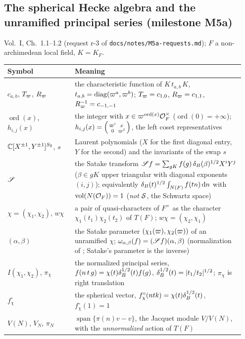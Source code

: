 \subsection*{The spherical Hecke algebra and the unramified principal series (milestone M5a)}\label{notation:m5a}
Vol.~I, Ch.~1.1--1.2 (request r-3 of \texttt{docs/notes/M5a-requests.md}); $F$ a non-archimedean local field, $K=K_F$.
\begin{longtable}{@{}p{0.27\linewidth}p{0.68\linewidth}@{}}
\toprule
Symbol & Meaning \\ \midrule
\endhead
$c_{a,b}$, $T_\varpi$, $R_\varpi$ & the characteristic function of $K\,t_{a,b}\,K$, $t_{a,b}=\operatorname{diag}(\varpi^a,\varpi^b)$; $T_\varpi=c_{1,0}$, $R_\varpi=c_{1,1}$,
  $R_\varpi^{-1}=c_{-1,-1}$ \\
$\operatorname{ord}(x)$, $h_{i,j}(x)$ & the integer with $x\in\varpi^{\operatorname{ord}(x)}\mathcal{O}_F^\times$ ($\operatorname{ord}(0)=+\infty$);
  $h_{i,j}(x)=\begin{psmallmatrix}\varpi^i&x\\0&\varpi^j\end{psmallmatrix}$, the left coset representatives \\
$\mathbb{C}[X^{\pm1},Y^{\pm1}]^{S_2}$, $s$ & Laurent polynomials ($X$ for the first diagonal entry, $Y$ for the second) and the invariants of the swap $s$ \\
$\mathscr{S}$ & the Satake transform $\mathscr{S} f=\sum_{gK}f(g)\,\delta_B(\beta)^{1/2}X^iY^j$ ($\beta\in gK$ upper triangular with diagonal exponents $(i,j)$);
  equivalently $\delta_B(t)^{1/2}\int_{N(F)}f(tn)\,\mathrm{d} n$ with $\operatorname{vol}(N(\mathcal{O}_F))=1$ (\emph{not} $\mathcal{S}$, the Schwartz space) \\
$\chi=(\chi_1,\chi_2)$, $w\chi$ & a pair of quasi-characters of $F^\times$ as the character $\chi_1(t_1)\chi_2(t_2)$ of $T(F)$; $w\chi=(\chi_2,\chi_1)$ \\
$(\alpha,\beta)$ & the Satake parameter $(\chi_1(\varpi),\chi_2(\varpi))$ of an unramified $\chi$; $\omega_{\alpha,\beta}(f)=(\mathscr{S} f)(\alpha,\beta)$
  (normalization of \cite[Prop.~40]{BumpH}; Satake's parameter is the inverse) \\
$I(\chi_1,\chi_2)$, $\pi_\chi$ & the normalized principal series, $f(n\,t\,g)=\chi(t)\delta_B^{1/2}(t)f(g)$, $\delta_B^{1/2}(t)=\lvert t_1/t_2\rvert^{1/2}$;
  $\pi_\chi$ is right translation \\
$f^\circ_\chi$ & the spherical vector, $f^\circ_\chi(ntk)=\chi(t)\delta_B^{1/2}(t)$, $f^\circ_\chi(1)=1$ \\
$V(N)$, $V_N$, $\pi_N$ & $\operatorname{span}\{\pi(n)v-v\}$, the Jacquet module $V/V(N)$, with the \emph{unnormalized} action of $T(F)$ \\
\bottomrule
\end{longtable}

